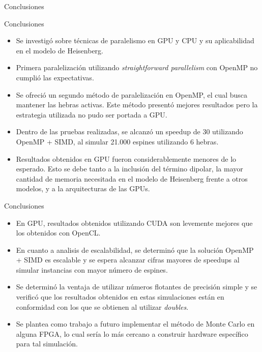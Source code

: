 \begin{frame}
\vfill
\begin{center}
\begin{block}{\begin{center}\begin{Huge}Conclusiones\end{Huge}\end{center}}
\end{block}
\end{center}
\end{frame}

\begin{frame}{Conclusiones}
\begin{itemize}
  \item Se investigó sobre técnicas de paralelismo en GPU y CPU y su aplicabilidad en el modelo de Heisenberg.
  \item Primera paralelización utilizando \textit{straightforward parallelism} con OpenMP no cumplió las expectativas.
  \item Se ofreció un segundo método de paralelización en OpenMP, el cual busca mantener las hebras activas. Este método presentó mejores resultados pero la estrategia utilizada no pudo ser portada a GPU.
  \item Dentro de las pruebas realizadas, se alcanzó un speedup de 30 utilizando OpenMP + SIMD, al simular 21.000 espines utilizando 6 hebras.
  \item Resultados obtenidos en GPU fueron considerablemente menores de lo esperado. Esto se debe tanto a la inclusión del término dipolar, la mayor cantidad de memoria necesitada en el modelo de Heisenberg frente a otros modelos, y a la arquitecturas de las GPUs.
\end{itemize}
\end{frame}

\begin{frame}{Conclusiones}
\begin{itemize}
  \item En GPU, resultados obtenidos utilizando CUDA son levemente mejores que los obtenidos con OpenCL.
  \item En cuanto a analisis de escalabilidad, se determinó que la solución OpenMP + SIMD es escalable y se espera alcanzar cifras mayores de speedups al simular instancias con mayor número de espines.
  \item Se determinó la ventaja de utilizar números flotantes de precisión simple y se verificó que los resultados obtenidos en estas simulaciones están en conformidad con los que se obtienen al utilizar \textit{doubles}.
  \item Se plantea como trabajo a futuro implementar el método de Monte Carlo en alguna FPGA, lo cual sería lo más cercano a construir hardware específico para tal simulación.
\end{itemize}
\end{frame}